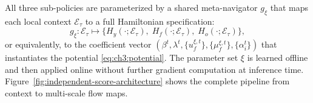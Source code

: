 All three sub-policies are parameterized by a shared meta-navigator
$g_\xi$ that maps each local context $\mathcal{E}_\tau$ to a full
Hamiltonian specification:
\begin{equation}
  g_\xi : \mathcal{E}_\tau
  \longmapsto
  \bigl\{
    H_y(\cdot;\mathcal{E}_\tau),\;
    H_f(\cdot;\mathcal{E}_\tau),\;
    H_o(\cdot;\mathcal{E}_\tau)
  \bigr\},
  \label{eq:ch3:metanav}
\end{equation}
or equivalently, to the coefficient vector
$(\beta^t, \lambda^t, \{u_{f}^{\xi,t}\}, \{\mu_f^{\xi,t}\}, \{\alpha_i^t\})$
that instantiates the potential \cref{eq:ch3:potential}.
The parameter set $\xi$ is learned offline and then applied online
without further gradient computation at inference time. Figure~\ref{fig:independent-score-architecture} shows the complete pipeline from context to multi-scale flow maps.

